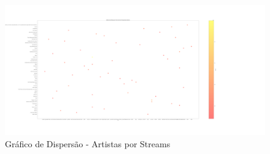 \documentclass[11pt]{article}
\makeatletter
\def\maxwidth{\ifdim\Gin@nat@width>\linewidth\linewidth
    \else\Gin@nat@width\fi}
\let\Oldincludegraphics\includegraphics
\renewcommand{\includegraphics}[1]{\Oldincludegraphics[width=.8\maxwidth]{#1}}
\makeatother
\begin{document}
\begin{figure}
\centering
\includegraphics{ArtistasPorStreamsCores.png}
\caption{Gráfico de Dispersão - Artistas por Streams}
\end{figure}


    
    
    
    
\end{document}
